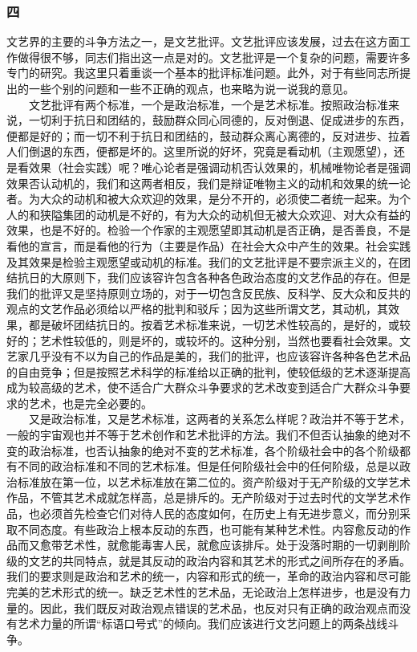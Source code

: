 \documentclass[cn,11pt,chinese]{elegantbook}
\def\myformat#1{\hfil\hfil #1}
\begin{document}
\subsubsection*{\myformat{四}}
文艺界的主要的斗争方法之一，是文艺批评。文艺批评应该发展，过去在这方面工作做得很不够，同志们指出这一点是对的。文艺批评是一个复杂的问题，需要许多专门的研究。我这里只着重谈一个基本的批评标准问题。此外，对于有些同志所提出的一些个别的问题和一些不正确的观点，也来略为说一说我的意见。\\
　　文艺批评有两个标准，一个是政治标准，一个是艺术标准。按照政治标准来说，一切利于抗日和团结的，鼓励群众同心同德的，反对倒退、促成进步的东西，便都是好的；而一切不利于抗日和团结的，鼓动群众离心离德的，反对进步、拉着人们倒退的东西，便都是坏的。这里所说的好坏，究竟是看动机（主观愿望），还是看效果（社会实践）呢？唯心论者是强调动机否认效果的，机械唯物论者是强调效果否认动机的，我们和这两者相反，我们是辩证唯物主义的动机和效果的统一论者。为大众的动机和被大众欢迎的效果，是分不开的，必须使二者统一起来。为个人的和狭隘集团的动机是不好的，有为大众的动机但无被大众欢迎、对大众有益的效果，也是不好的。检验一个作家的主观愿望即其动机是否正确，是否善良，不是看他的宣言，而是看他的行为（主要是作品）在社会大众中产生的效果。社会实践及其效果是检验主观愿望或动机的标准。我们的文艺批评是不要宗派主义的，在团结抗日的大原则下，我们应该容许包含各种各色政治态度的文艺作品的存在。但是我们的批评又是坚持原则立场的，对于一切包含反民族、反科学、反大众和反共的观点的文艺作品必须给以严格的批判和驳斥；因为这些所谓文艺，其动机，其效果，都是破坏团结抗日的。按着艺术标准来说，一切艺术性较高的，是好的，或较好的；艺术性较低的，则是坏的，或较坏的。这种分别，当然也要看社会效果。文艺家几乎没有不以为自己的作品是美的，我们的批评，也应该容许各种各色艺术品的自由竞争；但是按照艺术科学的标准给以正确的批判，使较低级的艺术逐渐提高成为较高级的艺术，使不适合广大群众斗争要求的艺术改变到适合广大群众斗争要求的艺术，也是完全必要的。\\
　　又是政治标准，又是艺术标准，这两者的关系怎么样呢？政治并不等于艺术，一般的宇宙观也并不等于艺术创作和艺术批评的方法。我们不但否认抽象的绝对不变的政治标准，也否认抽象的绝对不变的艺术标准，各个阶级社会中的各个阶级都有不同的政治标准和不同的艺术标准。但是任何阶级社会中的任何阶级，总是以政治标准放在第一位，以艺术标准放在第二位的。资产阶级对于无产阶级的文学艺术作品，不管其艺术成就怎样高，总是排斥的。无产阶级对于过去时代的文学艺术作品，也必须首先检查它们对待人民的态度如何，在历史上有无进步意义，而分别采取不同态度。有些政治上根本反动的东西，也可能有某种艺术性。内容愈反动的作品而又愈带艺术性，就愈能毒害人民，就愈应该排斥。处于没落时期的一切剥削阶级的文艺的共同特点，就是其反动的政治内容和其艺术的形式之间所存在的矛盾。我们的要求则是政治和艺术的统一，内容和形式的统一，革命的政治内容和尽可能完美的艺术形式的统一。缺乏艺术性的艺术品，无论政治上怎样进步，也是没有力量的。因此，我们既反对政治观点错误的艺术品，也反对只有正确的政治观点而没有艺术力量的所谓“标语口号式”的倾向。我们应该进行文艺问题上的两条战线斗争。\\
\end{document}
